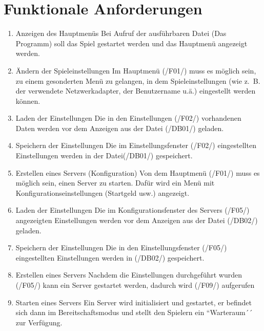 \documentclass[a4paper,10pt]{article}
\begin{document}
\section{Funktionale Anforderungen}
\begin{enumerate}[/F01/]
\item Anzeigen des Hauptmenüs
Bei Aufruf der ausführbaren Datei (Das Programm) soll das Spiel gestartet werden und das Hauptmenü angezeigt werden.

\item Ändern der Spieleinstellungen
Im Hauptmenü (\rightarrow /F01/) muss es möglich sein, zu einem gesonderten Menü zu gelangen, in dem Spieleinstellungen (wie z.~B. der verwendete Netzwerkadapter, der Benutzername u.ä.) eingestellt werden können.

\item Laden der Einstellungen
Die in den Einstellungen (\rightarrow /F02/) vorhandenen Daten werden vor dem Anzeigen aus der Datei (\rightarrow /DB01/) geladen.

\item Speichern der Einstellungen
Die im Einstellungsfenster (\rightarrow /F02/) eingestellten Einstellungen werden in der Datei(\rightarrow /DB01/) gespeichert.

\item Erstellen eines Servers (Konfiguration)
Von dem Hauptmenü (\rightarrow /F01/) muss es möglich sein, einen Server zu starten. Dafür wird ein Menü mit Konfigurationseinstellungen (Startgeld usw.) angezeigt.

\item Laden der Einstellungen
Die im Konfigurationsfenster des Servers (\rightarrow /F05/) angezeigten Einstellungen werden vor dem Anzeigen aus der Datei (\rightarrow /DB02/) geladen.

\item Speichern der Einstellungen
Die in den Einstellungsfenster (\rightarrow /F05/) eingestellten Einstellungen werden in (\rightarrow /DB02/) gespeichert.

\item Erstellen eines Servers
Nachdem die Einstellungen durchgeführt wurden (\rightarrow /F05/) kann ein Server gestartet werden, dadurch wird (\rightarrow /F09/) aufgerufen

\item Starten eines Servers
Ein Server wird initialisiert und gestartet, er befindet sich dann im Bereitschaftsmodus und stellt den Spielern ein ``Warteraum´´ zur Verfügung.


\end{enumerate}
\end{document}
